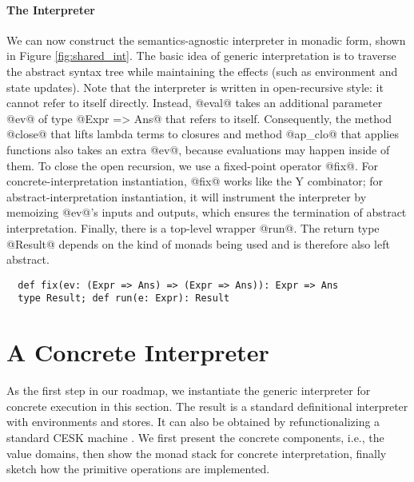 \paragraph{The Interpreter} We can now construct the semantics-agnostic interpreter
in monadic form, shown in Figure \ref{fig:shared_int}. The basic idea
of generic interpretation is to traverse the abstract syntax tree
while maintaining the effects (such as environment and state updates).
Note that the interpreter is written in open-recursive style: it cannot
refer to itself directly. Instead, @eval@ takes an additional parameter @ev@ of
type @Expr => Ans@ that refers to itself. Consequently, the method @close@ that
lifts lambda terms to closures and method @ap_clo@ that applies functions also
takes an extra @ev@, because evaluations may happen inside of them.
To close the open recursion, we use a fixed-point operator @fix@.
For concrete-interpretation instantiation, @fix@ works like the Y combinator;
for abstract-interpretation instantiation, it will instrument the interpreter
by memoizing @ev@'s inputs and outputs, which ensures the termination of
abstract interpretation.
Finally, there is a top-level wrapper @run@. The return type @Result@
depends on the kind of monads being used and is therefore also left abstract.
\begin{lstlisting}
  def fix(ev: (Expr => Ans) => (Expr => Ans)): Expr => Ans
  type Result; def run(e: Expr): Result
\end{lstlisting}


\section{A Concrete Interpreter} \label{unstaged_conc}

As the first step in our roadmap, we instantiate the generic interpreter for
concrete execution in this section. The result is a standard definitional
interpreter with environments and stores. It can also be obtained by
refunctionalizing a standard CESK machine \cite{Felleisen:1987:CAH:41625.41654,
DBLP:conf/ppdp/AgerBDM03}. We first present the concrete components, i.e., the
value domains, then show the monad stack for concrete interpretation, finally
sketch how the primitive operations are implemented.

